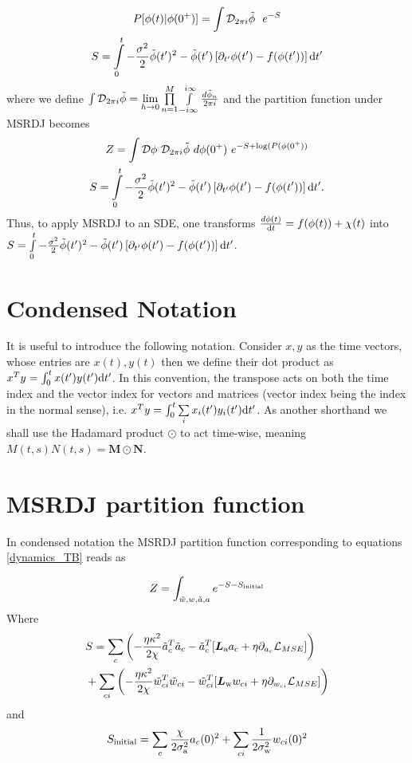 \begin{gather}
P[\phi(t)|\phi(0^+)] = \int \mathcal{D}_{2\pi i}{\tilde{\phi}}\ \  e^{-S} \notag\\
S=\int\limits_0^t  -\frac{\sigma^2}{2}\tilde{\phi}(t')^2-\tilde{\phi}(t')\left[\partial_{t'}\phi(t')-f(\phi(t'))\right]\text{d} t'
\end{gather}
where we define $\int\mathcal{D}_{2\pi i}\tilde{\phi} = \lim\limits_{h\rightarrow 0}\prod\limits_{n=1}^M\int\limits_{-i\infty}^{i\infty}\frac{d\tilde{\phi}_n}{2\pi i}$ and the partition function under MSRDJ becomes
\begin{gather}
    Z=\int \cD{\phi\ \cD_{2\pi i}\tilde{\phi}}\ d\phi(0^+)\ e^{-S+\log(P(\phi(0^+))} \nonumber\\
    S=\int\limits_0^t - \frac{\sigma^2}{2}\tilde{\phi}(t')^2-\tilde{\phi}(t')\left[\partial_{t'}\phi(t')-f(\phi(t'))\right]\dif t'.
\end{gather}
Thus, to apply MSRDJ to an SDE, one transforms $\frac{d\phi(t)}{\text{d} t} = f(\phi(t)) +\chi(t)$ into $S=\int\limits_0^t - \frac{\sigma^2}{2}\tilde{\phi}(t')^2-\tilde{\phi}(t')\left[\partial_{t'}\phi(t')-f(\phi(t'))\right]\text{d} t'$.

\section{Condensed Notation}
It is useful to introduce the following notation. Consider $x,y$ as the time vectors, whose entries are $x(t),y(t)$ then we define their dot product as $x^T y=\int_0^t x(t')y(t') \text{d} t'$. In this convention, the transpose acts on both the time index and the vector index for vectors and matrices (vector index being the index in the normal sense), i.e. $x^Ty = \int_{0}^t \sum\limits_{i}  x_i(t') y_i(t') \text{d} t'$.
As another shorthand we shall use the Hadamard product $\odot$ to act time-wise, meaning $M(t,s)N(t,s)=\bm{M}\odot\bm{N}$.

\section{MSRDJ partition function}
In condensed notation the MSRDJ partition function corresponding to equations \ref{dynamics_TB} reads as
 
\begin{align}
Z=
\int_{\tilde{w},w,\tilde{a},a} 
e^{-S-S_{\text{initial}}}\notag
\end{align}
Where
\begin{align}
&S=
\sum\limits_c\left(-\frac{\eta\kappa^2}{2\chi}\tilde{a}_{c}^T\tilde{a}_{c} 
- \tilde{a}_{c}^T[\bm{L}_{\rm a} a_{c} 
+ \eta \partial_{a_c} \mathcal{L}_{MSE}]\right) \\ \nonumber
&+\sum\limits_{ci}\left(- \frac{\eta\kappa^2}{2\chi} \tilde{w}_{ci}^T \tilde{w}_{ci} 
- \tilde{w}_{ci}^T [\bm{L}_{\rm w} w_{ci}+\eta \partial_{w_{ci}} \mathcal{L}_{MSE}] \right)
\end{align}
and
\begin{equation}
S_{\text{initial}} = \sum\limits_c\frac{\chi}{2\sigma_{\rm a}^2} a_c(0)^2+\sum\limits_{ci}\frac{1}{2\sigma_{\rm w}^2}w_{ci}(0)^2
\end{equation}


